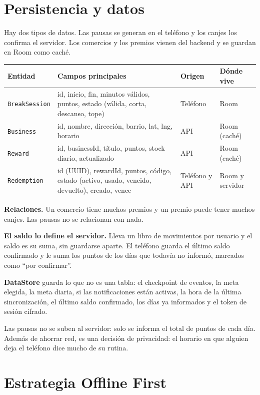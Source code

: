 \section{Persistencia y datos}
\label{sec:datos}

Hay dos tipos de datos. Las pausas se generan en el teléfono y los canjes los confirma el servidor. Los comercios y los premios vienen del backend y se guardan en Room como caché.

\begin{table}[H]
\centering\small
\begin{tabularx}{\textwidth}{@{}l L l l@{}}
\toprule
\textbf{Entidad} & \textbf{Campos principales} & \textbf{Origen} & \textbf{Dónde vive} \\
\midrule
\texttt{BreakSession} & id, inicio, fin, minutos válidos, puntos, estado (válida, corta, descanso, tope) & Teléfono & Room \\
\texttt{Business} & id, nombre, dirección, barrio, lat, lng, horario & API & Room (caché) \\
\texttt{Reward} & id, businessId, título, puntos, stock diario, actualizado & API & Room (caché) \\
\texttt{Redemption} & id (UUID), rewardId, puntos, código, estado (activo, usado, vencido, devuelto), creado, vence & Teléfono y API & Room y servidor \\
\bottomrule
\end{tabularx}
\end{table}

\textbf{Relaciones.} Un comercio tiene muchos premios y un premio puede tener muchos canjes. Las pausas no se relacionan con nada.

\textbf{El saldo lo define el servidor.} Lleva un libro de movimientos por usuario y el saldo es su suma, sin guardarse aparte. El teléfono guarda el último saldo confirmado y le suma los puntos de los días que todavía no informó, marcados como “por confirmar”.

\textbf{DataStore} guarda lo que no es una tabla: el checkpoint de eventos, la meta elegida, la meta diaria, si las notificaciones están activas, la hora de la última sincronización, el último saldo confirmado, los días ya informados y el token de sesión cifrado.

Las pausas no se suben al servidor: solo se informa el total de puntos de cada día. Además de ahorrar red, es una decisión de privacidad: el horario en que alguien deja el teléfono dice mucho de su rutina.

\section{Estrategia Offline First}
\label{sec:offline}

